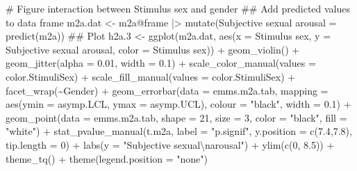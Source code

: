 \documentclass[
  bookmarksnumbered]{article}
\newenvironment{Shaded}{\begin{snugshade}}{\end{snugshade}}
\newcommand{\AttributeTok}[1]{\textcolor[rgb]{0.80,0.80,0.80}{#1}}
\newcommand{\CommentTok}[1]{\textcolor[rgb]{0.50,0.62,0.50}{#1}}
\newcommand{\DecValTok}[1]{\textcolor[rgb]{0.86,0.86,0.80}{#1}}
\newcommand{\DocumentationTok}[1]{\textcolor[rgb]{0.50,0.62,0.50}{#1}}
\newcommand{\FloatTok}[1]{\textcolor[rgb]{0.75,0.75,0.82}{#1}}
\newcommand{\FunctionTok}[1]{\textcolor[rgb]{0.94,0.94,0.56}{#1}}
\newcommand{\NormalTok}[1]{\textcolor[rgb]{0.80,0.80,0.80}{#1}}
\newcommand{\OtherTok}[1]{\textcolor[rgb]{0.94,0.94,0.56}{#1}}
\newcommand{\SpecialCharTok}[1]{\textcolor[rgb]{0.86,0.64,0.64}{#1}}
\newcommand{\StringTok}[1]{\textcolor[rgb]{0.80,0.58,0.58}{#1}}
\begin{document}
\begin{Shaded}
\begin{Highlighting}[]
\CommentTok{\# Figure interaction between Stimulus sex and gender}
\DocumentationTok{\#\# Add predicted values to data frame}
\NormalTok{m2a.dat }\OtherTok{\textless{}{-}}\NormalTok{ m2a}\SpecialCharTok{@}\NormalTok{frame }\SpecialCharTok{|\textgreater{}} 
  \FunctionTok{mutate}\NormalTok{(}\StringTok{\textasciigrave{}}\AttributeTok{Subjective sexual arousal}\StringTok{\textasciigrave{}} \OtherTok{=} \FunctionTok{predict}\NormalTok{(m2a))}
\DocumentationTok{\#\# Plot}
\NormalTok{h2a}\FloatTok{.3} \OtherTok{\textless{}{-}} \FunctionTok{ggplot}\NormalTok{(m2a.dat, }\FunctionTok{aes}\NormalTok{(}\AttributeTok{x =} \StringTok{\textasciigrave{}}\AttributeTok{Stimulus sex}\StringTok{\textasciigrave{}}\NormalTok{, }
                             \AttributeTok{y =} \StringTok{\textasciigrave{}}\AttributeTok{Subjective sexual arousal}\StringTok{\textasciigrave{}}\NormalTok{, }
                             \AttributeTok{color =} \StringTok{\textasciigrave{}}\AttributeTok{Stimulus sex}\StringTok{\textasciigrave{}}\NormalTok{)) }\SpecialCharTok{+}
  \FunctionTok{geom\_violin}\NormalTok{() }\SpecialCharTok{+}
  \FunctionTok{geom\_jitter}\NormalTok{(}\AttributeTok{alpha =} \FloatTok{0.01}\NormalTok{, }\AttributeTok{width =} \FloatTok{0.1}\NormalTok{) }\SpecialCharTok{+}
  \FunctionTok{scale\_color\_manual}\NormalTok{(}\AttributeTok{values =}\NormalTok{ color.StimuliSex) }\SpecialCharTok{+}
  \FunctionTok{scale\_fill\_manual}\NormalTok{(}\AttributeTok{values =}\NormalTok{ color.StimuliSex) }\SpecialCharTok{+}
  \FunctionTok{facet\_wrap}\NormalTok{(}\SpecialCharTok{\textasciitilde{}}\NormalTok{Gender) }\SpecialCharTok{+}
  \FunctionTok{geom\_errorbar}\NormalTok{(}\AttributeTok{data =}\NormalTok{ emms.m2a.tab, }
                \AttributeTok{mapping =} \FunctionTok{aes}\NormalTok{(}\AttributeTok{ymin =}\NormalTok{ asymp.LCL, }\AttributeTok{ymax =}\NormalTok{ asymp.UCL), }
                \AttributeTok{colour =} \StringTok{"black"}\NormalTok{, }\AttributeTok{width =} \FloatTok{0.1}\NormalTok{) }\SpecialCharTok{+}
  \FunctionTok{geom\_point}\NormalTok{(}\AttributeTok{data =}\NormalTok{ emms.m2a.tab, }
             \AttributeTok{shape =} \DecValTok{21}\NormalTok{, }\AttributeTok{size =} \DecValTok{3}\NormalTok{,}
             \AttributeTok{color =} \StringTok{"black"}\NormalTok{, }\AttributeTok{fill =} \StringTok{"white"}\NormalTok{) }\SpecialCharTok{+}
  \FunctionTok{stat\_pvalue\_manual}\NormalTok{(t.m2a, }
                     \AttributeTok{label =} \StringTok{"p.signif"}\NormalTok{, }
                     \AttributeTok{y.position =} \FunctionTok{c}\NormalTok{(}\FloatTok{7.4}\NormalTok{,}\FloatTok{7.8}\NormalTok{), }
                     \AttributeTok{tip.length =} \DecValTok{0}\NormalTok{) }\SpecialCharTok{+}
  \FunctionTok{labs}\NormalTok{(}\AttributeTok{y =} \StringTok{"Subjective sexual}\SpecialCharTok{\textbackslash{}n}\StringTok{arousal"}\NormalTok{) }\SpecialCharTok{+}
  \FunctionTok{ylim}\NormalTok{(}\FunctionTok{c}\NormalTok{(}\DecValTok{0}\NormalTok{, }\FloatTok{8.5}\NormalTok{)) }\SpecialCharTok{+}
  \FunctionTok{theme\_tq}\NormalTok{() }\SpecialCharTok{+}
  \FunctionTok{theme}\NormalTok{(}\AttributeTok{legend.position =} \StringTok{"none"}\NormalTok{)}


\end{Highlighting}
\end{Shaded}
\end{document}
